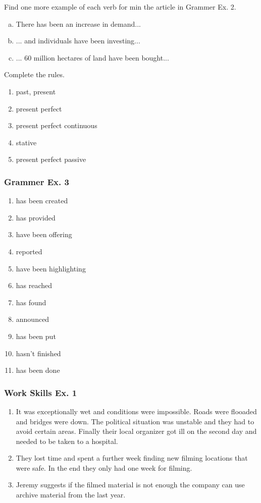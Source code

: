 \documentclass[12pt, a4paper, oneside]{article}
\begin{document}
  Find one more example of each verb for min the article in Grammer Ex. 2.
  \begin{enumerate}[a.)]
    \item There has been an increase in demand...
    \item ... and individuals have been investing...
    \item ... 60 million hectares of land have been bought...
  \end{enumerate}

  Complete the rules.
  \begin{enumerate}[1.]
    \item past, present
    \item present perfect
    \item present perfect continuous
    \item stative
    \item present perfect passive
  \end{enumerate}

  \subsubsection{Grammer Ex. 3}
  \begin{enumerate}[1.]
    \item has been created
    \item has provided
    \item have been offering
    \item reported
    \item have been highlighting
    \item has reached
    \item has found
    \item announced
    \item has been put
    \item hasn't finished
    \item has been done
  \end{enumerate}

  \subsubsection{Work Skills Ex. 1}
  \begin{enumerate}[1.]
    \item It was exceptionally wet and conditions were impossible. Roads were flooaded and bridges were down. The political situation was unstable and they had to avoid certain areas. Finally their local organizer got ill on the second day and needed to be taken to a hospital.
    \item They lost time and spent a further week finding new filming locations that were safe. In the end they only had one week for filming.
    \item Jeremy suggests if the filmed material is not enough the company can use archive material from the last year.
  \end{enumerate}
\end{document}
